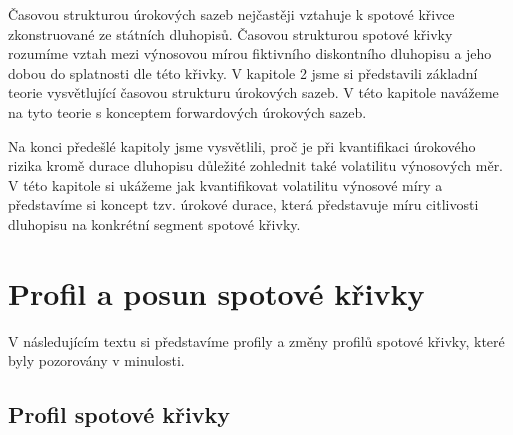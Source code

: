 \documentclass[a4paper]{book}
\begin{document}
Časovou strukturou úrokových sazeb nejčastěji vztahuje k spotové křivce zkonstruované ze státních dluhopisů. Časovou strukturou spotové křivky rozumíme vztah mezi výnosovou mírou fiktivního diskontního dluhopisu a jeho dobou do splatnosti dle této křivky. V kapitole 2 jsme si představili základní teorie vysvětlující časovou strukturu úrokových sazeb. V této kapitole navážeme na tyto teorie s konceptem forwardových úrokových sazeb.

Na konci předešlé kapitoly jsme vysvětlili, proč je při kvantifikaci úrokového rizika kromě durace dluhopisu důležité zohlednit také volatilitu výnosových měr. V této kapitole si ukážeme jak kvantifikovat volatilitu výnosové míry a představíme si koncept tzv. úrokové durace, která představuje míru citlivosti dluhopisu na konkrétní segment spotové křivky.

\section{Profil a posun spotové křivky}

V následujícím textu si představíme profily a změny profilů spotové křivky, které byly pozorovány v minulosti.

\subsection{Profil spotové křivky}
\end{document}

